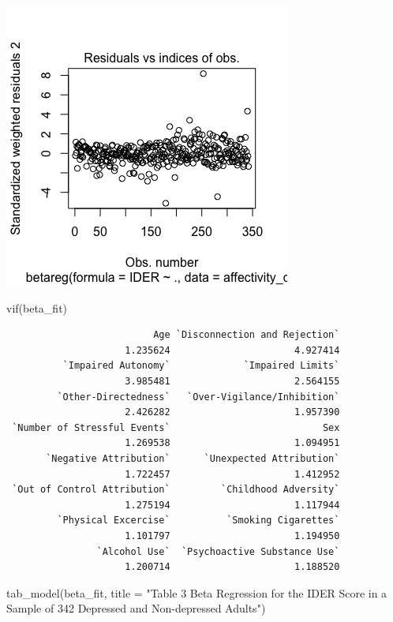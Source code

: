 \documentclass[
  letterpaper,
  DIV=11,
  numbers=noendperiod]{scrartcl}
\newenvironment{Shaded}{\begin{snugshade}}{\end{snugshade}}
\newcommand{\AttributeTok}[1]{\textcolor[rgb]{0.40,0.45,0.13}{#1}}
\newcommand{\FunctionTok}[1]{\textcolor[rgb]{0.28,0.35,0.67}{#1}}
\newcommand{\NormalTok}[1]{\textcolor[rgb]{0.00,0.23,0.31}{#1}}
\newcommand{\StringTok}[1]{\textcolor[rgb]{0.13,0.47,0.30}{#1}}
\begin{document}
\includegraphics{assumption_plots/Residuals_observations.png}

\begin{Shaded}
\begin{Highlighting}[]
\FunctionTok{vif}\NormalTok{(beta\_fit)}
\end{Highlighting}
\end{Shaded}

\begin{verbatim}
                          Age `Disconnection and Rejection` 
                     1.235624                      4.927414 
          `Impaired Autonomy`             `Impaired Limits` 
                     3.985481                      2.564155 
         `Other-Directedness`   `Over-Vigilance/Inhibition` 
                     2.426282                      1.957390 
 `Number of Stressful Events`                           Sex 
                     1.269538                      1.094951 
       `Negative Attribution`      `Unexpected Attribution` 
                     1.722457                      1.412952 
 `Out of Control Attribution`         `Childhood Adversity` 
                     1.275194                      1.117944 
         `Physical Excercise`          `Smoking Cigarettes` 
                     1.101797                      1.194950 
                `Alcohol Use`  `Psychoactive Substance Use` 
                     1.200714                      1.188520 
\end{verbatim}

\begin{Shaded}
\begin{Highlighting}[]
\FunctionTok{tab\_model}\NormalTok{(beta\_fit,}
          \AttributeTok{title =} \StringTok{"Table 3 Beta Regression for the IDER Score in a Sample of}
\StringTok{          342 Depressed and Non{-}depressed Adults"}\NormalTok{)}
\end{Highlighting}
\end{Shaded}
\end{document}
